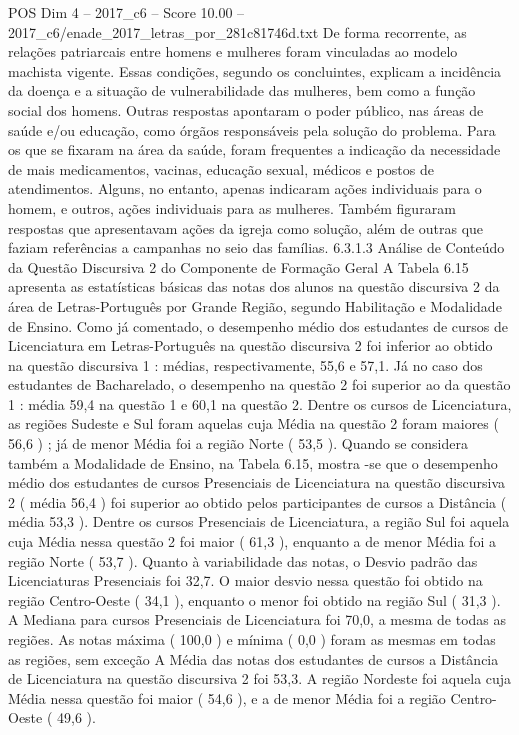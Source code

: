 \begin{textsample}{POS Dim 4 – 2017\_c6 – Score 10.00 – 2017\_c6/enade\_2017\_letras\_por\_281c81746d.txt}
De forma recorrente, as relações patriarcais entre homens e mulheres foram vinculadas ao modelo machista vigente.
Essas condições, segundo os concluintes, explicam a incidência da doença e a situação de vulnerabilidade das mulheres, bem como a função social dos homens.
Outras respostas apontaram o poder público, nas áreas de saúde e/ou educação, como órgãos responsáveis pela solução do problema.
Para os que se fixaram na área da saúde, foram frequentes a indicação da necessidade de mais medicamentos, vacinas, educação sexual, médicos e postos de atendimentos.
Alguns, no entanto, apenas indicaram ações individuais para o homem, e outros, ações individuais para as mulheres.
Também figuraram respostas que apresentavam ações da igreja como solução, além de outras que faziam referências a campanhas no seio das famílias. 6.3.1.3 Análise de Conteúdo da Questão Discursiva 2 do Componente de Formação Geral A Tabela 6.15 apresenta as estatísticas básicas das notas dos alunos na questão discursiva 2 da área de Letras-Português por Grande Região, segundo Habilitação e Modalidade de Ensino.
Como já comentado, o desempenho médio dos estudantes de cursos de Licenciatura em Letras-Português na questão discursiva 2 foi inferior ao obtido na questão discursiva 1 : médias, respectivamente, 55,6 e 57,1.
Já no caso dos estudantes de Bacharelado, o desempenho na questão 2 foi superior ao da questão 1 : média 59,4 na questão 1 e 60,1 na questão 2.
Dentre os cursos de Licenciatura, as regiões Sudeste e Sul foram aquelas cuja Média na questão 2 foram maiores ( 56,6 ) ; já de menor Média foi a região Norte ( 53,5 ).
Quando se considera também a Modalidade de Ensino, na Tabela 6.15, mostra -se que o desempenho médio dos estudantes de cursos Presenciais de Licenciatura na questão discursiva 2 ( média 56,4 ) foi superior ao obtido pelos participantes de cursos a Distância ( média 53,3 ).
Dentre os cursos Presenciais de Licenciatura, a região Sul foi aquela cuja Média nessa questão 2 foi maior ( 61,3 ), enquanto a de menor Média foi a região Norte ( 53,7 ).
Quanto à variabilidade das notas, o Desvio padrão das Licenciaturas Presenciais foi 32,7.
O maior desvio nessa questão foi obtido na região Centro-Oeste ( 34,1 ), enquanto o menor foi obtido na região Sul ( 31,3 ).
A Mediana para cursos Presenciais de Licenciatura foi 70,0, a mesma de todas as regiões.
As notas máxima ( 100,0 ) e mínima ( 0,0 ) foram as mesmas em todas as regiões, sem exceção A Média das notas dos estudantes de cursos a Distância de Licenciatura na questão discursiva 2 foi 53,3.
A região Nordeste foi aquela cuja Média nessa questão foi maior ( 54,6 ), e a de menor Média foi a região Centro-Oeste ( 49,6 ).

\end{textsample}
